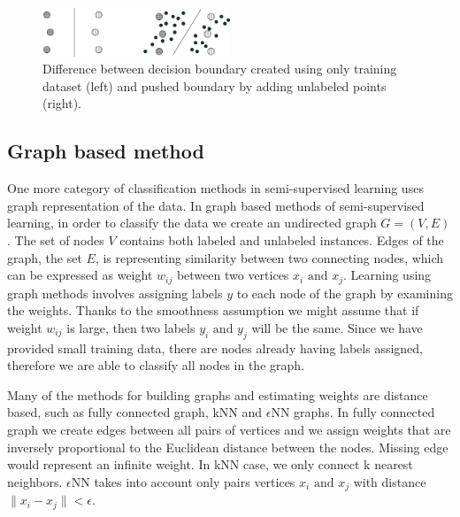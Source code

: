 \documentclass[12pt, a4paper, pdflatex]{report}
\begin{document}
\begin{figure}[htbp]
\centering
\includegraphics[width=0.5\textwidth]{graphics/s3vm.png}
\begin{tiny}
\caption{ Difference between decision boundary created using only training dataset (left) and pushed boundary by adding unlabeled points (right).\label{fig:SvmMethodFig}}
\end{tiny}
\vspace{1cm}
\end{figure}

\subsection{Graph based method}

One more category of classification methods in semi-supervised learning uses graph representation of the data. In graph based methods of semi-supervised learning, in order to classify the data we create an undirected graph $ G = (V, E) $. The set of nodes $ V $ contains both labeled and unlabeled instances. Edges of the graph, the set $ E $, is representing similarity between two connecting nodes, which can be expressed as weight $ w_{ij} $ between two vertices $x_{i} \text{ and } x_{j} $. Learning using graph methods involves assigning labels $ y $ to each node of the graph by examining the weights. Thanks to the smoothness assumption we might assume that if weight $ w_{ij} $ is large, then two labels $ y_i \text{ and } y_j $ will be the same. Since we have provided small training data, there are nodes already having labels assigned, therefore we are able to classify all nodes in the graph\cite{Zhu06semi}.

Many of the methods for building graphs and estimating weights are distance based, such as fully connected graph, kNN and $\epsilon$NN graphs\cite{Zhu06semi}. In fully connected graph we create edges between all pairs of vertices and we assign weights that are inversely proportional to the Euclidean distance between the nodes. Missing edge would represent an infinite weight\cite{chapelle06}. In kNN case, we only connect k nearest neighbors. $\epsilon$NN takes into account only pairs vertices $ x_i \text{ and } x_j $ with distance $ \| x_i - x_j \| < \epsilon $.\\[1cm]
\end{document}

